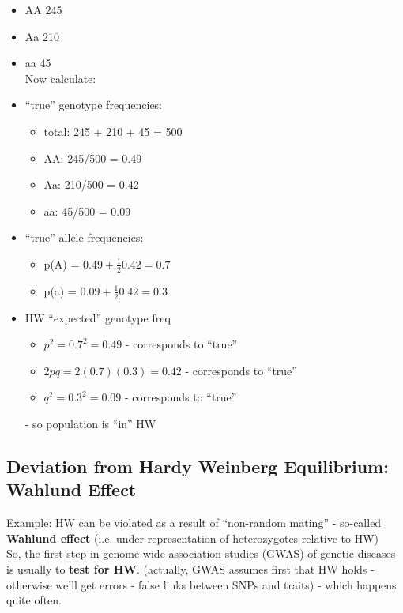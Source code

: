 \documentclass{scrartcl}
\begin{document}
\begin{itemize}
\item AA 245
\item Aa 210
\item aa 45\\
  Now calculate:
\item ``true'' genotype frequencies:
  \begin{itemize}
  \item total: 245 + 210 + 45 = 500
  \item AA: 245/500 = 0.49
  \item Aa: 210/500 = 0.42
  \item aa: 45/500 = 0.09
  \end{itemize}
\item ``true'' allele frequencies:
  \begin{itemize}
  \item p(A) = $0.49 + \frac12 0.42 = 0.7$
  \item p(a) = $0.09 + \frac12 0.42 = 0.3$
  \end{itemize}
\item HW ``expected'' genotype freq
  \begin{itemize}
  \item $p^2 = 0.7^2 = 0.49$ - corresponds to ``true''
  \item $2pq = 2(0.7)(0.3) = 0.42$ - corresponds to ``true''
  \item $q^2 = 0.3^2 = 0.09$ - corresponds to ``true''
  \end{itemize} - so population is ``in'' HW
\end{itemize}
\subsection{Deviation from Hardy Weinberg Equilibrium: Wahlund Effect}
\label{sec:6-3}
Example: HW can be violated as a result of ``non-random mating'' - so-called {\bf Wahlund effect} (i.e. under-representation of heterozygotes relative to HW)\\
So, the first step in genome-wide association studies (GWAS) of genetic diseases is usually to {\bf test for HW}.
(actually, GWAS assumes first that HW holds - otherwise we'll get errors - false links between SNPs and traits) - which happens quite often.

\end{document}
